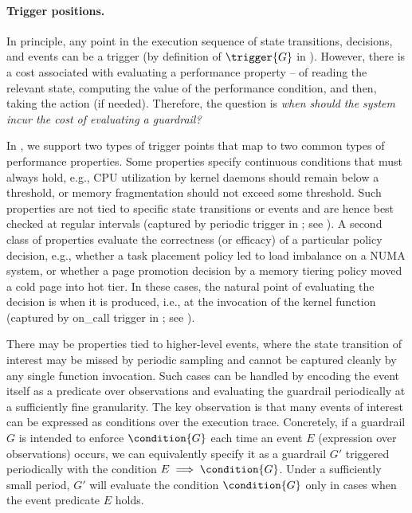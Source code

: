 \paragraph{Trigger positions.}
In principle, any point in the execution sequence of state transitions, decisions, and events can be a trigger (by definition of $\trigger{G}$ in ).
However, there is a cost associated with evaluating a performance property -- of reading the relevant state, computing the value of the performance condition, and then, taking the action (if needed).
Therefore, the question is {\it when should the system incur the cost of evaluating a guardrail?}

In \lang, we support two types of trigger points that map to two common types of performance properties.
Some properties specify continuous conditions that must always hold, e.g., CPU utilization by kernel daemons should remain below a threshold, or memory fragmentation should not exceed some threshold. Such properties are not tied to specific state transitions or events and are hence best checked at regular intervals (captured by \textsf{periodic} trigger in \lang; see ).
A second class of properties evaluate the correctness (or efficacy) of a particular policy decision, e.g., whether a task placement policy led to load imbalance on a NUMA system, or whether a page promotion decision by a memory tiering policy moved a cold page into hot tier.
In these cases, the natural point of evaluating the decision is when it is produced, i.e., at the invocation of the kernel function (captured by \textsf{on_call} trigger in \lang; see ).

There may be properties tied to higher-level events, where the state transition of interest may be missed by periodic sampling and cannot be captured cleanly by any single function invocation.
Such cases can be handled by encoding the event itself as a predicate over observations and evaluating the guardrail periodically at a sufficiently fine granularity.
The key observation is that many events of interest can be expressed as conditions over the execution trace.
Concretely, if a guardrail $G$ is intended to enforce $\condition{G}$ each time an event $E$ (expression over observations) occurs, we can equivalently specify it as a guardrail $G'$ triggered periodically with the condition $E\implies\condition{G}$. Under a sufficiently small period, $G'$ will evaluate the condition $\condition{G}$ only in cases when the event predicate $E$ holds.

